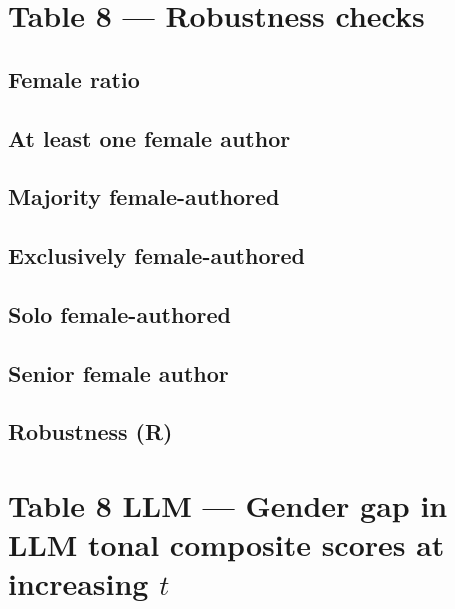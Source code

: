 \documentclass[12pt]{article}
\begin{document}
\section{Table 8 --- Robustness checks}

\subsection{Female ratio}

\clearpage

\subsection{At least one female author}

\clearpage

\subsection{Majority female-authored}

\clearpage

\subsection{Exclusively female-authored}

\clearpage

\subsection{Solo female-authored}

\clearpage

\subsection{Senior female author}

\clearpage

\subsection{Robustness (R)}

\clearpage

\section{Table 8 LLM --- Gender gap in LLM tonal composite scores at increasing \(t\)}
\end{document}
